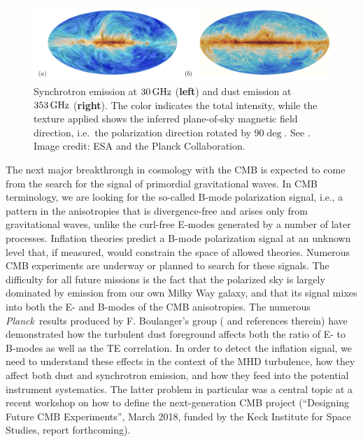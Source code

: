 \documentclass[12pt]{article}
\newcommand{\planck}{\textit{Planck}}
\newcommand{\GHz}{{\rm GHz}}  %
\begin{document}
\begin{figure}[]
\includegraphics[width=\columnwidth]{maps_lowres.png}
 \caption{Synchrotron emission at $30\,\GHz$ ({\bf left}) and dust emission at $353\,\GHz$ ({\bf right}).
The color indicates the total intensity, while the texture applied shows the inferred plane-of-sky magnetic field direction, i.e.\ the polarization direction rotated by $90
\deg$.
See \citet{planck15_I}. Image credit: ESA and the Planck Collaboration.}
\label{fig:planck}
\end{figure}


The next major breakthrough in cosmology with the CMB is expected to come from the search for the signal of primordial gravitational waves. In CMB terminology, we are looking for the so-called B-mode polarization signal, i.e., a pattern in the anisotropies that is divergence-free and arises only from gravitational waves, unlike the curl-free E-modes generated by a number of later processes. Inflation theories predict a B-mode polarization signal at an unknown level that, if measured, would constrain the space of allowed theories. Numerous CMB experiments are underway or planned to search for these signals. 
The difficulty for all future missions is the fact that the polarized sky is largely dominated by emission from our own Milky Way galaxy, and that its signal mixes into both the E- and B-modes of the CMB anisotropies. The numerous \planck\ results produced by F. Boulanger's group (\citealt{pipLIV} and references therein)  have demonstrated how the turbulent dust foreground affects both the ratio of E- to B-modes as well as the TE correlation.  In order to detect the inflation signal, we need to understand these effects in the context of the MHD turbulence, how they affect both dust and synchrotron emission, and how they feed into the potential instrument systematics. The latter problem in particular was a central topic at a recent workshop on how to define the next-generation CMB project (``Designing Future CMB Experiments'', March 2018, funded by the Keck Institute for Space Studies, report forthcoming). 
\end{document}
